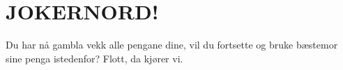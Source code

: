 \chapter{JOKERNORD!}
\thispagestyle{fancy}
Du har nå gambla vekk alle pengane dine, vil du fortsette og bruke bæstemor sine penga istedenfor?
Flott, da kjører vi.

    